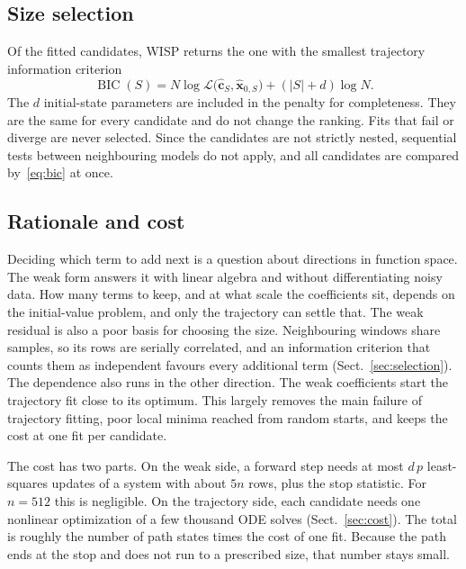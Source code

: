 \documentclass[10pt]{article}
\newcommand{\BIC}{\operatorname{BIC}}
\begin{document}
\subsection{Size selection}
Of the fitted candidates, WISP returns the one with the smallest trajectory information criterion
\begin{equation}
\BIC(S)=N\log\mathcal L\big(\hat{\bm c}_S,\hat{\bm x}_{0,S}\big)+(|S|+d)\log N .
\label{eq:bic}
\end{equation}
The $d$ initial-state parameters are included in the penalty for completeness. They are the same for every candidate
and do not change the ranking. Fits that fail or diverge are never selected. Since the candidates are not strictly
nested, sequential tests between neighbouring models do not apply, and all candidates are compared
by~\eqref{eq:bic} at once.

\subsection{Rationale and cost}
Deciding which term to add next is a question about directions in function space. The weak form answers it with
linear algebra and without differentiating noisy data. How many terms to keep, and at what scale the coefficients
sit, depends on the initial-value problem, and only the trajectory can settle that. The weak residual is also a poor
basis for choosing the size. Neighbouring windows share samples, so its rows are serially correlated, and an
information criterion that counts them as independent favours every additional term (Sect.~\ref{sec:selection}).
The dependence also runs in the other direction. The weak coefficients start the trajectory fit close to its optimum.
This largely removes the main failure of trajectory fitting, poor local minima reached from random starts, and keeps
the cost at one fit per candidate.

The cost has two parts. On the weak side, a forward step needs at most $d\,p$ least-squares updates of a system with
about $5n$ rows, plus the stop statistic. For $n=512$ this is negligible. On the trajectory side, each candidate needs
one nonlinear optimization of a few thousand ODE solves (Sect.~\ref{sec:cost}). The total is roughly the
number of path states times the cost of one fit. Because the path ends at the stop and does not run to a prescribed
size, that number stays small.
\end{document}

